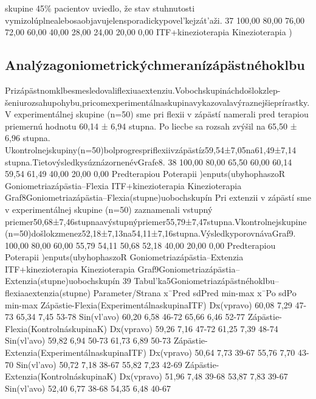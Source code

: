 skupine 45\% pacientov uviedlo, že stav stuhnutosti vymizolúplnealebosaobjavujelensporadickypovel’kejzát’aži. 37 100,00 80,00 76,00 72,00 60,00 40,00 28,00 24,00 20,00 0,00 ITF+kinezioterapia Kinezioterapia )%


\subsection{Analýzagoniometrickýchmeranízápästnéhoklbu}

Prizápästnomklbesmesledovaliflexiuaextenziu.Vobochskupináchdošlokzlep- šeniurozsahupohybu,pricomexperimentálnaskupinavykazovalavýraznejšieprírastky. V experimentálnej skupine (n=50) sme pri flexii v zápästí namerali pred terapiou priemernú hodnotu 60,14 ± 6,94 stupna. Po liecbe sa rozsah zvýšil na 65,50 ± 6,96 stupna. Ukontrolnejskupiny(n=50)bolprogrespriflexiivzápästíz59,54±7,05na61,49±7,14 stupna.TietovýsledkysúznázornenévGrafe8. 38 100,00 80,00 65,50 60,00 60,14 59,54 61,49 40,00 20,00 0,00 Predterapiou Poterapii )enputs(ubyhophaszoR Goniometriazápästia--Flexia ITF+kinezioterapia Kinezioterapia Graf8Goniometriazápästia--Flexia(stupne)uobochskupín Pri extenzii v zápästí sme v experimentálnej skupine (n=50) zaznamenali vstupný priemer50,68±7,46stupnaavýstupnýpriemer55,79±7,47stupna.Vkontrolnejskupine (n=50)došlokzmenez52,18±7,13na54,11±7,16stupna.VýsledkyporovnávaGraf9. 100,00 80,00 60,00 55,79 54,11 50,68 52,18 40,00 20,00 0,00 Predterapiou Poterapii )enputs(ubyhophaszoR Goniometriazápästia--Extenzia ITF+kinezioterapia Kinezioterapia Graf9Goniometriazápästia--Extenzia(stupne)uobochskupín 39 Tabul’ka5Goniometriazápästnéhoklbu--flexiaaextenzia(stupne) Parameter/Strana x¯Pred sdPred min-max x¯Po sdPo min-max Zápästie-Flexia(ExperimentálnaskupinaITF) Dx(vpravo) 60,08 7,29 47-73 65,34 7,45 53-78 Sin(vl’avo) 60,20 6,58 46-72 65,66 6,46 52-77 Zápästie-Flexia(KontrolnáskupinaK) Dx(vpravo) 59,26 7,16 47-72 61,25 7,39 48-74 Sin(vl’avo) 59,82 6,94 50-73 61,73 6,89 50-73 Zápästie-Extenzia(ExperimentálnaskupinaITF) Dx(vpravo) 50,64 7,73 39-67 55,76 7,70 43-70 Sin(vl’avo) 50,72 7,18 38-67 55,82 7,23 42-69 Zápästie-Extenzia(KontrolnáskupinaK) Dx(vpravo) 51,96 7,48 39-68 53,87 7,83 39-67 Sin(vl’avo) 52,40 6,77 38-68 54,35 6,48 40-67


